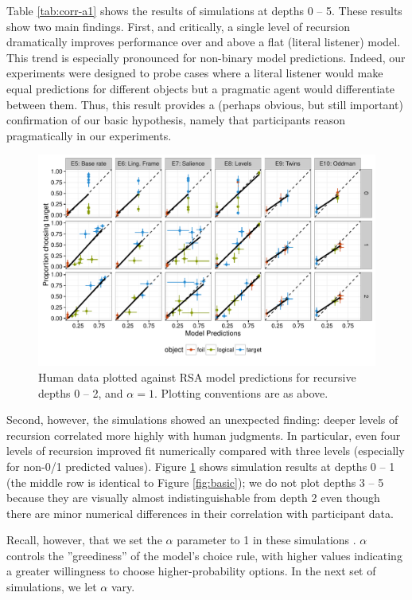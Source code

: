 \documentclass[man,noapacite]{apa2}
\begin{document}
Table \ref{tab:corr-a1} shows the results of simulations at depths 0 -- 5. These results show two main findings. First, and critically, a single level of recursion dramatically improves performance over and above a flat (literal listener) model. This trend is especially pronounced for non-binary model predictions. Indeed, our experiments were designed to probe cases where a literal listener would make equal predictions for different objects but a pragmatic agent would differentiate between them. Thus, this result provides a (perhaps obvious, but still important) confirmation of our basic hypothesis, namely that participants reason pragmatically in our experiments.

\begin{figure}[t]
 \centering
 \includegraphics[width=6in]{../plots/model_depth.pdf}
 \caption{\label{fig:depths} Human data plotted against RSA model predictions for recursive depths 0 -- 2, and $\alpha=1$. Plotting conventions are as above.}
\end{figure}

Second, however, the simulations showed an unexpected finding: deeper levels of recursion correlated more highly with human judgments. In particular, even four levels of recursion improved fit numerically compared with three levels (especially for non-0/1 predicted values). Figure \ref{fig:depths} shows simulation results at depths 0 -- 1 (the middle row is identical to Figure \ref{fig:basic}); we do not plot depths 3 -- 5 because they are visually almost indistinguishable from depth 2 even though there are minor numerical differences in their correlation with participant data.

Recall, however, that we set the $\alpha$ parameter to 1 in these simulations . $\alpha$ controls the ''greediness'' of the model's choice rule, with higher values indicating a greater willingness to choose higher-probability options. In the next set of simulations, we let $\alpha$ vary.
\end{document}

